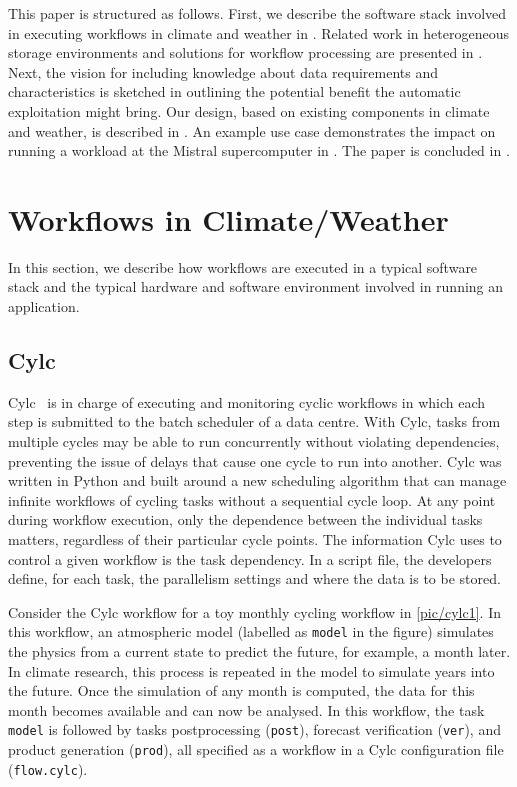 \documentclass{superfri}
\begin{document}
This paper is structured as follows.
First, we describe the software stack involved in executing workflows in climate and weather in .
Related work in heterogeneous storage environments and solutions for workflow processing are presented in .
Next, the vision for including knowledge about data requirements and characteristics is sketched in  outlining the potential benefit the automatic exploitation might bring.
Our design, based on existing components in climate and weather, is described in .
An example use case demonstrates the impact on running a workload at the Mistral supercomputer in .
The paper is concluded in .

\section{Workflows in Climate/Weather}
\label{sec:workflows}

In this section, we describe how workflows are executed in a typical software stack and the typical hardware and software environment involved in running an application.

\subsection{Cylc}

Cylc~\cite{8675433} is in charge of executing and monitoring cyclic workflows in which each step is submitted to the batch scheduler of a data centre.
With Cylc, tasks from multiple cycles may be able to run concurrently without violating dependencies, preventing the issue of delays that cause one cycle to run into another.
Cylc was written in Python and built around a new scheduling algorithm that can manage infinite workflows of cycling tasks without a sequential cycle loop.
At any point during workflow execution, only the dependence between the individual tasks matters, regardless of their particular cycle points.
The information Cylc uses to control a given workflow is the task dependency.
In a script file, the developers define, for each task, the parallelism settings and where the data is to be stored.


Consider the Cylc workflow for a toy monthly cycling workflow in \cref{pic/cylc1}.
In this workflow, an atmospheric model (labelled as \texttt{model} in the figure) simulates the physics from a current state to predict the future, for example, a month later.
In climate research, this process is repeated in the model to simulate years into the future.
Once the simulation of any month is computed, the data for this month becomes available and can now be analysed.
In this workflow, the task \texttt{model} is followed by tasks postprocessing (\texttt{post}), forecast verification (\texttt{ver}), and product generation (\texttt{prod}), all specified as a workflow in a Cylc configuration file (\texttt{flow.cylc}).
\end{document}
